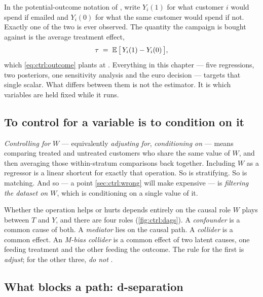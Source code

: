 In the potential-outcome notation of \citet{rubin1974}, write $Y_i(1)$ for what customer $i$
would spend if emailed and $Y_i(0)$ for what the same customer would spend if not. Exactly one of
the two is ever observed. The quantity the campaign is bought against is the average treatment
effect,
%
\begin{equation}
  \tau \;=\; \operatorname{\mathbb{E}}\big[\,Y_i(1) - Y_i(0)\,\big],
  \label{eq:ctrl:estimand}
\end{equation}
%
which \cref{eq:ctrl:outcome} plants at \eur{\nbFiveTrueAte}. Everything in this chapter --- five
regressions, two posteriors, one sensitivity analysis and the euro decision --- targets that
single scalar. What differs between them is not the estimator. It is which variables are held
fixed while it runs.

\subsection*{To control for a variable is to condition on it}

\emph{Controlling for} $W$ --- equivalently \emph{adjusting for}, \emph{conditioning on} --- means
comparing treated and untreated customers who share the same value of $W$, and then averaging
those within-stratum comparisons back together. Including $W$ as a regressor is a linear shortcut
for exactly that operation. So is stratifying. So is matching. And so --- a point
\cref{sec:ctrl:wrong} will make expensive --- is \emph{filtering the dataset on $W$}, which is
conditioning on a single value of it.

Whether the operation helps or hurts depends entirely on the causal role $W$ plays between $T$
and $Y$, and there are four roles (\cref{fig:ctrl:dags}). A \emph{confounder} is a common cause
of both. A \emph{mediator} lies on the causal path. A \emph{collider} is a common effect. An
\emph{M-bias collider} is a common effect of two latent causes, one feeding treatment and the
other feeding the outcome. The rule for the first is \emph{adjust}; for the other three,
\emph{do not} \citep{cinelli2022}.

\subsection*{What blocks a path: d-separation}

